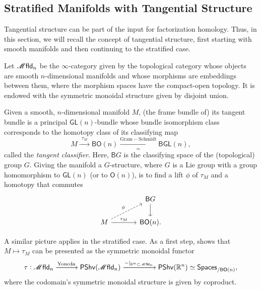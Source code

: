 \documentclass[../text]{subfiles}
\begin{document}
\subsection{Stratified Manifolds with Tangential Structure}

Tangential structure can be part of the input for factorization homology. Thus, in this section, we will recall the concept of tangential structure, first starting with smooth manifolds and then continuing to the stratified case.

\begin{definition}
    Let $\mfld_n$ be the $\infty$-category given by the topological category whose objects are smooth $n$-dimensional manifolds and whose morphisms are embeddings between them, where the morphism spaces have the compact-open topology. It is endowed with the symmetric monoidal structure given by disjoint union.
\end{definition}

Given a smooth, $n$-dimensional manifold $M$, (the frame bundle of) its tangent bundle is a principal $\mathsf{GL}(n)$-bundle whose bundle isomorphism class corresponds to the homotopy class of its classifying map
%
\begin{equation}
    M \xrightarrow{\ \ \tau_M \ \ } \mathsf{BO}(n) \xrightarrow[\simeq]{\mathrm{Gram-Schmidt}} \mathsf{BGL}(n),
\end{equation}
called the \emph{tangent classifier}. Here, $\mathsf{B}G$ is the classifying space of the (topological) group $G$. Giving the manifold a $G$-structure, where $G$ is a Lie group with a group homomorphism to $\mathsf{GL}(n)$ (or to $\mathsf{O}(n)$), is to find a lift $\phi$ of $\tau_M$ and a homotopy that commutes
%
\begin{equation}
    \begin{tikzcd}[column sep = large]
        & \mathsf{B}G \arrow[d] \\
        M \arrow[ru, dashed, "\phi"] \arrow[r, "\tau_M"] & \mathsf{BO}(n).
    \end{tikzcd}
\end{equation}

A similar picture applies in the stratified case. As a first step, \cite[Corollary 2.13]{af_fhtop} shows that $M\mapsto\tau_M$ can be presented as the symmetric monoidal functor
%
\begin{equation}
    \tau: \mfld_n \xrightarrow{\mathrm{Yoneda}} \mathsf{PShv}(\mfld_n) \xrightarrow{-|_{\mathbb{R}^n \subset \mfld_n}} \mathsf{PShv}(\mathbb{R}^n) \simeq \mathsf{Spaces}_{/\mathsf{BO}(n)},
\end{equation}
where the codomain's symmetric monoidal structure is given by coproduct. 
\end{document}
